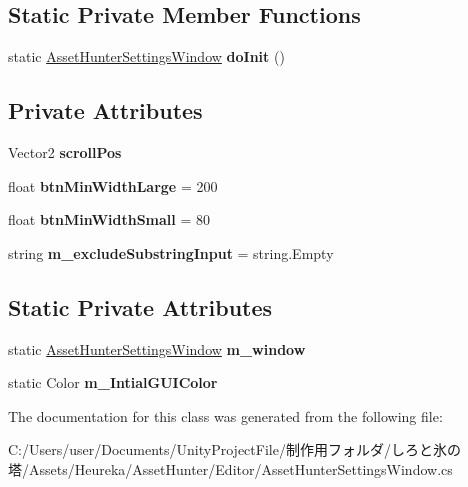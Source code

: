 \subsection*{Static Private Member Functions}
\begin{DoxyCompactItemize}
\item 
\mbox{\label{class_asset_hunter_settings_window_a78f5529be3b4cc2af7ffecc4df94e0e3}} 
static \hyperlink{class_asset_hunter_settings_window}{Asset\+Hunter\+Settings\+Window} {\bfseries do\+Init} ()
\end{DoxyCompactItemize}
\subsection*{Private Attributes}
\begin{DoxyCompactItemize}
\item 
\mbox{\label{class_asset_hunter_settings_window_a121f350da9882701ea46f133c0181ebb}} 
Vector2 {\bfseries scroll\+Pos}
\item 
\mbox{\label{class_asset_hunter_settings_window_a7703997683bb3d867902c0b123898dd3}} 
float {\bfseries btn\+Min\+Width\+Large} = 200
\item 
\mbox{\label{class_asset_hunter_settings_window_a5a8513600d2a5d7d24096752d6882426}} 
float {\bfseries btn\+Min\+Width\+Small} = 80
\item 
\mbox{\label{class_asset_hunter_settings_window_a8565d5450407c015d8d6356e94ed0d46}} 
string {\bfseries m\+\_\+exclude\+Substring\+Input} = string.\+Empty
\end{DoxyCompactItemize}
\subsection*{Static Private Attributes}
\begin{DoxyCompactItemize}
\item 
\mbox{\label{class_asset_hunter_settings_window_af7a8131eb74c71eefc6cfcba0dabcc58}} 
static \hyperlink{class_asset_hunter_settings_window}{Asset\+Hunter\+Settings\+Window} {\bfseries m\+\_\+window}
\item 
\mbox{\label{class_asset_hunter_settings_window_a485e203d2e328447239f9a40b8298cbb}} 
static Color {\bfseries m\+\_\+\+Intial\+G\+U\+I\+Color}
\end{DoxyCompactItemize}


The documentation for this class was generated from the following file\+:\begin{DoxyCompactItemize}
\item 
C\+:/\+Users/user/\+Documents/\+Unity\+Project\+File/制作用フォルダ/しろと氷の塔/\+Assets/\+Heureka/\+Asset\+Hunter/\+Editor/Asset\+Hunter\+Settings\+Window.\+cs\end{DoxyCompactItemize}

